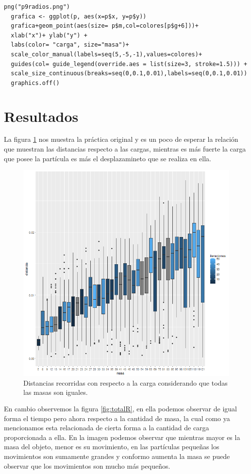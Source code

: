 \documentclass[a4paper]{article}
\begin{document}
\begin{lstlisting}[frame=single]
  png("p9radios.png")
  grafica <- ggplot(p, aes(x=p$x, y=p$y))
  grafica+geom_point(aes(size= p$m,col=colores[p$g+6]))+ 
  xlab("x")+ ylab("y") + 
  labs(color= "carga", size="masa")+
  scale_color_manual(labels=seq(5,-5,-1),values=colores)+
  guides(col= guide_legend(override.aes = list(size=3, stroke=1.5))) +
  scale_size_continuous(breaks=seq(0,0.1,0.01),labels=seq(0,0.1,0.01))
  graphics.off()
\end{lstlisting}

\section{Resultados}
La figura \ref*{fig:totaloriginal} nos muestra la práctica original y es un poco de esperar la relación que muestran las distancias respecto a las cargas, mientras es más fuerte la carga que posee la partícula es más el desplazamineto que se realiza en ella.

\begin{figure}[h!]
\centering
\includegraphics[width=0.7\linewidth]{totaloriginal}
\caption{Distancias recorridas con respecto a la carga considerando que todas las masas son iguales.}
\label{fig:totaloriginal}
\end{figure}

En cambio observemos la figura \ref{fig:totalR}, en ella podemos observar de igual forma el tiempo pero ahora respecto a la cantidad de masa, la cual como ya mencionamos esta relacionada de cierta forma a la cantidad de carga proporcionada a ella. En la imagen podemos observar que mientras mayor es la masa del objeto, menor es su movimiento, en las partículas pequeñas los movimientos son sumamente grandes y conformo aumenta la masa se puede observar que los movimientos son mucho más pequeños.
\end{document}

